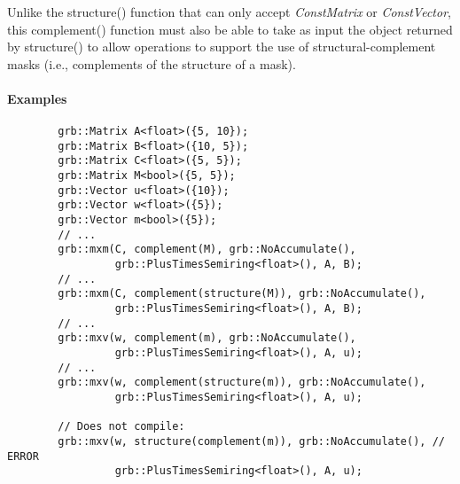 Unlike the {\sf structure()} function that can only accept \emph{ConstMatrix} or 
\emph{ConstVector}, this {\sf complement()} function must also be able to take as
input the object returned by {\sf structure()} to allow operations to support the
use of structural-complement masks (i.e., complements of the structure of a mask).

\paragraph{Examples}

\begin{verbatim}
        grb::Matrix A<float>({5, 10});
        grb::Matrix B<float>({10, 5});
        grb::Matrix C<float>({5, 5});
        grb::Matrix M<bool>({5, 5});
        grb::Vector u<float>({10});
        grb::Vector w<float>({5});
        grb::Vector m<bool>({5});
        // ...
        grb::mxm(C, complement(M), grb::NoAccumulate(), 
                 grb::PlusTimesSemiring<float>(), A, B);
        // ...
        grb::mxm(C, complement(structure(M)), grb::NoAccumulate(), 
                 grb::PlusTimesSemiring<float>(), A, B);
        // ...
        grb::mxv(w, complement(m), grb::NoAccumulate(), 
                 grb::PlusTimesSemiring<float>(), A, u);
        // ...
        grb::mxv(w, complement(structure(m)), grb::NoAccumulate(), 
                 grb::PlusTimesSemiring<float>(), A, u);

        // Does not compile:
        grb::mxv(w, structure(complement(m)), grb::NoAccumulate(), // ERROR
                 grb::PlusTimesSemiring<float>(), A, u);
\end{verbatim}
